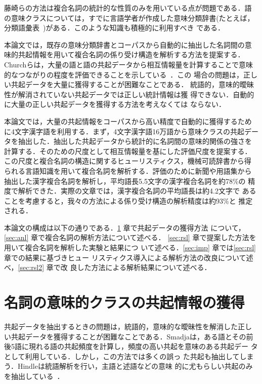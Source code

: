 藤崎らの方法は複合名詞の統計的な性質のみを用いている点が問題である．語
の意味クラスについては，すでに言語学者が作成した意味分類辞書(たとえば，
分類語彙表~\cite{hayashi:66:a})がある．このような知識も積極的に利用すべき
である．

本論文では，既存の意味分類辞書とコーパスから自動的に抽出した名詞間の意
味的共起情報を用いて複合名詞の係り受け構造を解析する方法を提案する．
Churchらは，大量の語と語の共起データから相互情報量を計算することで意味
的なつながりの程度を評価できることを示している~\cite{church:91:a}．この
場合の問題は，正しい共起データを大量に獲得することが困難なことである．
統語的，意味的曖昧性が解消されていない共起データでは正しい統計情報は獲
得できない．自動的に大量の正しい共起データを獲得する方法を考えなくては
ならない．

本論文では，大量の共起情報をコーパスから高い精度で自動的に獲得するため
に4文字漢字語を利用する．まず，4文字漢字語16万語から意味クラスの共起デー
タを抽出した．抽出した共起データから統計的に名詞間の意味的関係の強さを
計算する．そのための尺度として相互情報量を基にした評価尺度を提案する．
この尺度と複合名詞の構造に関するヒューリスティクス，機械可読辞書から得
られる言語知識を用いて複合名詞を解析する．評価のために新聞や用語集から
抽出した漢字複合名詞を解析し，平均語長5.5文字の漢字複合名詞を約78\%の
精度で解析できた．実際の文章では，漢字複合名詞の平均語長は約4.2文字で
あることを考慮すると，我々の方法による係り受け構造の解析精度は約93\%と
推定される．

本論文の構成は以下の通りである．\ref{sec:acq} 章で共起データの獲得方法
について，\ref{sec:anl} 章で複合名詞の解析方法について述べる．
\ref{sec:rsl} 章で提案した方法を用いて複合名詞を解析した実験と結果につ
いて述べる．\ref{sec:imp} 章では\ref{sec:rsl} 章での結果に基づきヒュー
リスティクス導入による解析方法の改良について述べ，\ref{sec:rsl2} 章で改
良した方法による解析結果について述べる．

\section{名詞の意味的クラスの共起情報の獲得}
\label{sec:acq}

共起データを抽出するときの問題は，統語的，意味的な曖昧性を解消した正し
い共起データを獲得することが困難なことである．Smadjaは，ある語とその前
後5語に現れる語の共起頻度を計算し，頻度の高い共起を意味のある共起デー
タとして利用している\cite{smadja:91:a}．しかし，この方法では多くの誤っ
た共起も抽出してしまう．Hindleは統語解析を行い，主語と述語などの意味
的に尤もらしい共起のみを抽出している~\cite{hindle:90:a}．

